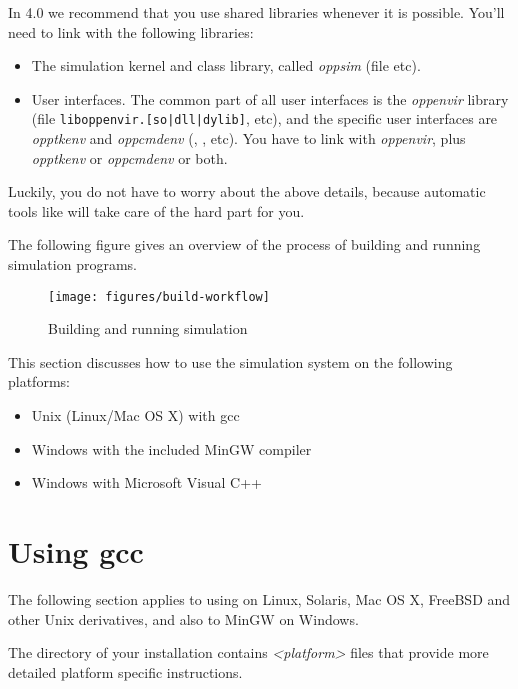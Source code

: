 In {\opp} 4.0 we recommend that you use shared libraries whenever it is possible.
You'll need to link with the following libraries:

\begin{itemize}
  \item{The simulation kernel and class library,
    called \textit{oppsim} (file  etc).}
  \item{User interfaces. The common part of all user interfaces is
    the \textit{oppenvir} library (file \texttt{liboppenvir.[so|dll|dylib]}, etc),
    and the specific user interfaces are \textit{opptkenv} and \textit{oppcmdenv}
    (, , etc).
    You have to link with \textit{oppenvir}, plus \textit{opptkenv} or
    \textit{oppcmdenv} or both.}
\end{itemize}

Luckily, you do not have to worry about the above details, because
automatic tools like  will take care of the hard
part for you.

The following figure gives an overview of the process of building
and running simulation programs.

\begin{figure}[htbp]
  \begin{center}
    \texttt{[image: figures/build-workflow]}
    \caption{Building and running simulation}
  \end{center}
\end{figure}


This section discusses how to use the simulation system on the
following platforms:
\begin{itemize}
  \item{Unix (Linux/Mac OS X) with gcc}
  \item{Windows with the included MinGW compiler}
  \ifcommercial\item{Windows with Microsoft Visual C++}\fi
\end{itemize}


\section{Using gcc}

The following section applies to using {\opp} on Linux, Solaris, Mac OS X, FreeBSD and
other Unix derivatives, and also to MinGW on Windows.

\begin{note}
The  directory of your {\opp} installation contains
\textit{<platform>} files that provide more detailed platform specific instructions.
\end{note}


